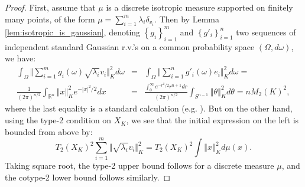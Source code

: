 \documentclass[12pt,oneside]{amsart}
\theoremstyle{definition}
\theoremstyle{remark}
\theoremstyle{proof}
\numberwithin{equation}{section}
\newcommand{\norm}[1]{\left\Vert#1\right\Vert}
\newcommand{\snorm}[1]{\Vert#1\Vert}
\newcommand{\abs}[1]{\left\vert#1\right\vert}
\newcommand{\set}[1]{\left\{#1\right\}}
\newcommand{\brac}[1]{\left(#1\right)}
\newcommand{\Real}{\mathbb{R}}
\begin{document}
\begin{proof}
First, assume that $\mu$ is a discrete isotropic measure
supported on finitely many points, of the form $\mu = \sum_{i=1}^m
\lambda_i \delta_{v_i}$.
Then by Lemma \ref{lem:isotropic_is_gaussian}, denoting
$\set{g_i}_{i=1}^m$ and $\set{g'_i}_{i=1}^n$ two sequences of
independent standard Gaussian r.v.'s on a common probability
space $(\Omega,d\omega)$, we have:
\begin{eqnarray}
\nonumber \int_\Omega \snorm{\sum_{i=1}^m g_i(\omega)
\sqrt{\lambda_i} v_i}^2_K d\omega & = & \int_{\Omega}
\snorm{\sum_{i=1}^n g'_i(\omega) e_i}^2_K d\omega = \\
\nonumber \frac{1}{(2\pi)^{n/2}}\int_{\Real^n} \norm{x}^2_K
e^{-\abs{x}^2/2} dx & = & \frac{\int_0^\infty e^{-r^2/2}r^{n+1}
dr}{(2\pi)^{n/2}} \int_{S^{n-1}} \norm{\theta}^2_K d\theta = n
M_2(K)^2,
\end{eqnarray}
where the last equality is a standard calculation (e.g.
\cite{Milman-Schechtman-Book}). But on the other hand, using the
type-2 condition on $X_K$, we see that the initial expression on
the left is bounded from above by:
\[
T_2(X_K)^2 \sum_{i=1}^m \snorm{ \sqrt{\lambda_i} v_i}^2_K  =
T_2(X_K)^2 \int\norm{x}^2_K d\mu(x).
\]
Taking square root, the type-2 upper bound follows for a discrete
measure $\mu$, and the cotype-2 lower bound follows similarly.


\end{proof}
\end{document}
